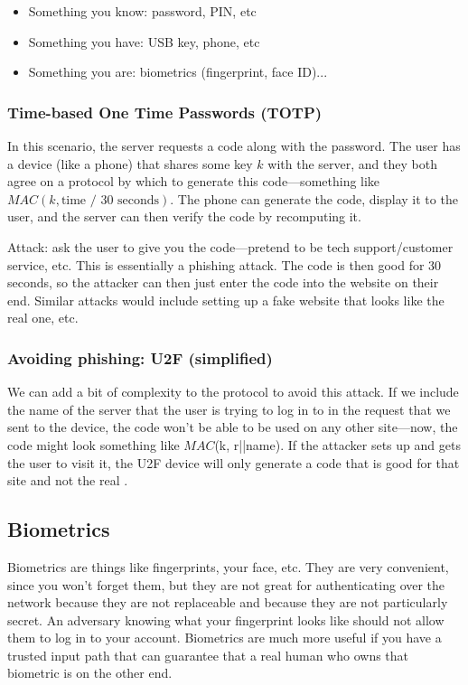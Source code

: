 \begin{itemize}
	\item Something you know: password, PIN, etc
	\item Something you have: USB key, phone, etc
	\item Something you are: biometrics (fingerprint, face ID)...
\end{itemize}

\subsubsection{Time-based One Time Passwords (TOTP)}
In this scenario, the server requests a code along with the password. The user has a device (like a phone) that shares some key $k$ with the server, and they both agree on a protocol by which to generate this code---something like $MAC(k, \text{time / 30 seconds})$. The phone can generate the code, display it to the user, and the server can then verify the code by recomputing it.

Attack: ask the user to give you the code---pretend to be tech support/customer service, etc. This is essentially a phishing attack. The code is then good for 30 seconds, so the attacker can then just enter the code into the website on their end. Similar attacks would include setting up a fake website that looks like the real one, etc.

\subsubsection{Avoiding phishing: U2F (simplified)}
We can add a bit of complexity to the protocol to avoid this attack. If we include the name of the server that the user is trying to log in to in the request that we sent to the device, the code won't be able to be used on any other site---now, the code might look something like $MAC$(k, r||name). If the attacker sets up  and gets the user to visit it, the U2F device will only generate a code that is good for that site and not the real . 
	
\subsection{Biometrics}
Biometrics are things like fingerprints, your face, etc. They are very convenient, since you won't forget them, but they are not great for authenticating over the network because they are not replaceable and because they are not particularly secret. An adversary knowing what your fingerprint looks like should not allow them to log in to your account. Biometrics are much more useful if you have a trusted input path that can guarantee that a real human who owns that biometric is on the other end.
